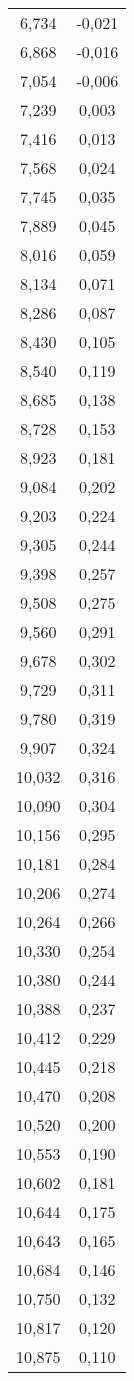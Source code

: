 \begin{longtable}{c c}
	6,734&-0,021 \\
	6,868&-0,016 \\
	7,054&-0,006 \\
	7,239&0,003 \\
	7,416&0,013 \\
	7,568&0,024 \\
	7,745&0,035 \\
	7,889&0,045 \\
	8,016&0,059 \\
	8,134&0,071 \\
	8,286&0,087 \\
	8,430&0,105 \\
	8,540&0,119 \\
	8,685&0,138 \\
	8,728&0,153 \\
	8,923&0,181 \\
	9,084&0,202 \\
	9,203&0,224 \\
	9,305&0,244 \\
	9,398&0,257 \\
	9,508&0,275 \\
	9,560&0,291 \\
	9,678&0,302 \\
	9,729&0,311 \\
	9,780&0,319 \\
	9,907&0,324 \\
	10,032&0,316 \\
	10,090&0,304 \\
	10,156&0,295 \\
	10,181&0,284 \\
	10,206&0,274 \\
	10,264&0,266 \\
	10,330&0,254 \\
	10,380&0,244 \\
	10,388&0,237 \\
	10,412&0,229 \\
	10,445&0,218 \\
	10,470&0,208 \\
	10,520&0,200 \\
	10,553&0,190 \\
	10,602&0,181 \\
	10,644&0,175 \\
	10,643&0,165 \\
	10,684&0,146 \\
	10,750&0,132 \\
	10,817&0,120 \\
	10,875&0,110 \\

\end{longtable}
